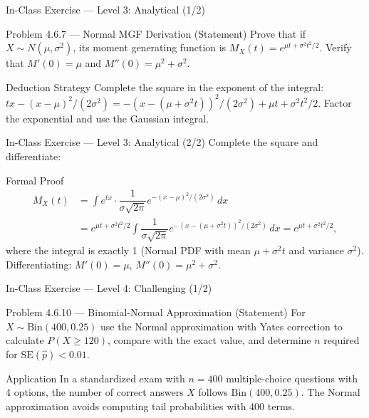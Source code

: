 \documentclass[aspectratio=169,xcolor={dvipsnames,table}]{beamer}
\begin{document}
\begin{frame}{In-Class Exercise --- Level 3: Analytical (1/2)}
	\vspace{-0.1cm}
	\begin{block}{Problem 4.6.7 --- Normal MGF Derivation (Statement)}
		Prove that if $X \sim N(\mu, \sigma^{2})$, its moment generating function is $M_{X}(t) = e^{\mu t + \sigma^{2}t^{2}/2}$. Verify that $M'(0) = \mu$ and $M''(0) = \mu^{2} + \sigma^{2}$.
	\end{block}
	\vspace{0.1cm}
	\pause
	\begin{alertblock}{Deduction Strategy}
		\scriptsize
		Complete the square in the exponent of the integral: $tx - (x-\mu)^{2}/(2\sigma^{2}) = -(x - (\mu + \sigma^{2}t))^{2}/(2\sigma^{2}) + \mu t + \sigma^{2}t^{2}/2$. Factor the exponential and use the Gaussian integral.
	\end{alertblock}
\end{frame}

\begin{frame}{In-Class Exercise --- Level 3: Analytical (2/2)}
	\vspace{-0.05cm}
	\scriptsize
	Complete the square and differentiate: \pause
	\begin{block}{Formal Proof}
		\scriptsize
		\begin{align*}
			M_{X}(t) &= \int e^{tx} \cdot \dfrac{1}{\sigma\sqrt{2\pi}} e^{-(x-\mu)^{2}/(2\sigma^{2})}\,dx \\
			&= e^{\mu t + \sigma^{2}t^{2}/2} \int \dfrac{1}{\sigma\sqrt{2\pi}} e^{-(x - (\mu + \sigma^{2}t))^{2}/(2\sigma^{2})}\,dx = e^{\mu t + \sigma^{2}t^{2}/2},
		\end{align*}
		where the integral is exactly 1 (Normal PDF with mean $\mu + \sigma^{2}t$ and variance $\sigma^{2}$). Differentiating: $M'(0) = \mu$, $M''(0) = \mu^{2} + \sigma^{2}$. \quad \qedhere
	\end{block}
\end{frame}

\begin{frame}{In-Class Exercise --- Level 4: Challenging (1/2)}
	\vspace{-0.1cm}
	\begin{block}{Problem 4.6.10 --- Binomial-Normal Approximation (Statement)}
		For $X \sim \text{Bin}(400, 0.25)$ use the Normal approximation with Yates correction to calculate $P(X \ge 120)$, compare with the exact value, and determine $n$ required for $\text{SE}(\hat{p}) < 0.01$.
	\end{block}
	\vspace{0.15cm}
	\pause
	\begin{alertblock}{Application}
		\scriptsize
		In a standardized exam with $n = 400$ multiple-choice questions with 4 options, the number of correct answers $X$ follows $\text{Bin}(400, 0.25)$. The Normal approximation avoids computing tail probabilities with 400 terms.
	\end{alertblock}
\end{frame}
\end{document}
